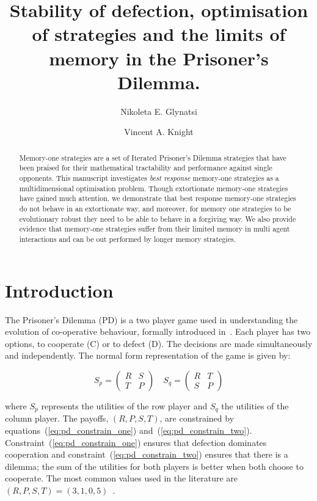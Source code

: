 \documentclass[10pt]{article}
\title{Stability of defection, optimisation of strategies and the limits of
       memory in the Prisoner's Dilemma.}
\author{Nikoleta E. Glynatsi \and Vincent A. Knight}
\date{}
\begin{document}
\maketitle

\begin{abstract}
    Memory-one strategies are a set of Iterated Prisoner's Dilemma strategies
    that have been praised for their mathematical tractability and performance
    against single opponents. This manuscript investigates \textit{best
    response} memory-one strategies as a multidimensional
    optimisation problem. Though extortionate memory-one strategies have gained
    much attention, we demonstrate that best response memory-one strategies do not
    behave in an extortionate way, and moreover, for memory one strategies to be
    evolutionary robust they need to be able to behave in a forgiving way. We
    also provide evidence that memory-one strategies suffer from their limited
    memory in multi agent interactions and can be out performed by
    longer memory strategies.
\end{abstract}

\section{Introduction}\label{section:introduction}

The Prisoner's Dilemma (PD) is a two player game used in understanding the
evolution of co-operative behaviour, formally introduced in~\cite{Flood1958}.
Each player has two options, to cooperate (C) or to defect (D). The decisions
are made simultaneously and independently. The normal form representation of the
game is given by:

\begin{equation}\label{equ:pd_definition}
    S_p =
    \begin{pmatrix}
        R & S  \\
        T & P
    \end{pmatrix}
    \quad
    S_q =
    \begin{pmatrix}
        R & T  \\
        S & P
    \end{pmatrix}
\end{equation}

where \(S_p\) represents the utilities of the row player and \(S_q\) the
utilities of the column player. The payoffs, \((R, P, S, T)\), are constrained
by equations~(\ref{eq:pd_constrain_one}) and~(\ref{eq:pd_constrain_two}).
Constraint~(\ref{eq:pd_constrain_one}) ensures that
defection dominates cooperation and constraint~(\ref{eq:pd_constrain_two})
ensures that there is a dilemma; the sum of the utilities for both players is
better when both choose to cooperate. The most common values used in the literature are
\((R, P, S, T) = (3, 1, 0, 5)\)~\cite{Axelrod1981}.
\end{document}
